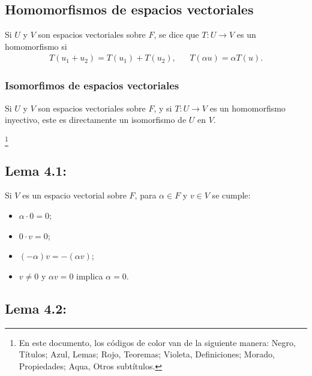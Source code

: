 \documentclass{article}
\newcommand\blfootnote[1]{%
  \begingroup
  \renewcommand\thefootnote{}\footnote{#1}%
  \addtocounter{footnote}{-1}%
  \endgroup
}
\renewcommand{\headrulewidth}{2pt}
\begin{document}
\subsection*{\color{violet} Homomorfismos de espacios vectoriales}

Si $U$ y $V$ son espacios vectoriales sobre $F$, se dice que $T:U\to V$ es un homomorfismo si
\begin{align*}
T(u_1+u_2)=T(u_1)+T(u_2), && T(\alpha u)=\alpha T(u).
\end{align*} 

\subsubsection*{\color{purple} Isomorfimos de espacios vectoriales}

Si $U$ y $V$ son espacios vectoriales sobre $F$, y si $T:U\to V$ es un homomorfismo inyectivo, este es directamente un isomorfismo de $U$ en $V$.


\blfootnote{En este documento, los códigos de color van de la siguiente manera: Negro, Títulos; \color{blue} Azul, Lemas; \color{red} Rojo, Teoremas; \color{violet} Violeta, Definiciones; \color{purple} Morado, Propiedades; \color{teal} Aqua, Otros subtítulos.}

\newpage
\pagestyle{fancy}
\fancyhf{}
\renewcommand{\headrulewidth}{2pt}
\fancyfoot{}
\rfoot{\thepage}
\lfoot{}
\setlength{\headheight}{28pt}

\subsection*{\color{blue} Lema 4.1:}

Si $V$ es un espacio vectorial sobre $F$, para $\alpha\in F$ y $v\in V$ se cumple:
\begin{itemize}

\item $\alpha\cdot 0=0$;

\item $0\cdot v=0$;

\item $(-\alpha)v=-(\alpha v)$;

\item $v\neq 0$ y $\alpha v=0$ implica $\alpha=0$.

\end{itemize}

\subsection*{\color{blue} Lema 4.2:}
\end{document}
